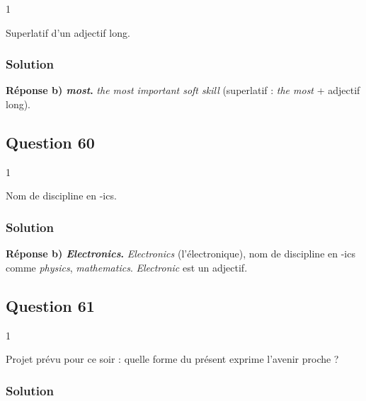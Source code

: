 \documentclass[11pt,a4paper]{article}
\begin{document}
\begin{indication}{1}

Superlatif d'un adjectif long.

\end{indication}

\hypertarget{solution-58}{%
\subsubsection{Solution}\label{solution-58}}

\textbf{Réponse b) \emph{most}.} \emph{the most important soft skill} (superlatif : \emph{the most} + adjectif long).

\hypertarget{question-60}{%
\subsection{Question 60}\label{question-60}}

\begin{indication}{1}

Nom de discipline en -ics.

\end{indication}

\hypertarget{solution-59}{%
\subsubsection{Solution}\label{solution-59}}

\textbf{Réponse b) \emph{Electronics}.} \emph{Electronics} (l'électronique), nom de discipline en -ics comme \emph{physics}, \emph{mathematics}. \emph{Electronic} est un adjectif.

\hypertarget{question-61}{%
\subsection{Question 61}\label{question-61}}

\begin{indication}{1}

Projet prévu pour ce soir : quelle forme du présent exprime l'avenir proche ?

\end{indication}

\hypertarget{solution-60}{%
\subsubsection{Solution}\label{solution-60}}
\end{document}
